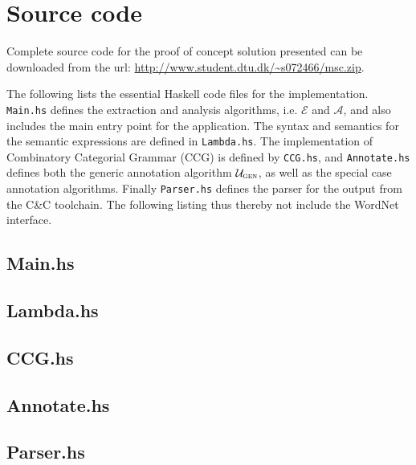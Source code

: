 \newcommand{\source}{../Code/CC}
\chapter{Source code}
\label{chap:source}

Complete source code for the proof of concept solution presented can be downloaded from the url: \url{http://www.student.dtu.dk/~s072466/msc.zip}.

The following lists the essential Haskell code files for the implementation. \texttt{Main.hs} defines the extraction and analysis algorithms, i.e. $\mathcal{E}$ and $\mathcal{A}$, and also includes the main entry point for the application. The syntax and semantics for the semantic expressions are defined in \texttt{Lambda.hs}. The implementation of Combinatory Categorial Grammar (CCG) is defined by \texttt{CCG.hs}, and \texttt{Annotate.hs} defines both the generic annotation algorithm $\mathcal{U}_\textsc{gen}$, as well as the special case annotation algorithms. Finally \texttt{Parser.hs} defines the parser for the output from the C\&C toolchain. The following listing thus thereby not include the WordNet interface.

\section*{Main.hs}


\section*{Lambda.hs}


\section*{CCG.hs}


\section*{Annotate.hs}


\section*{Parser.hs}


